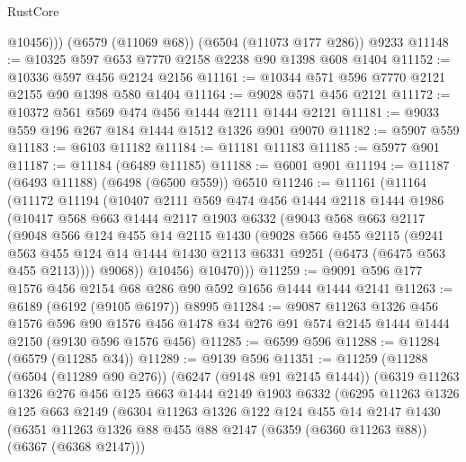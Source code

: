 \begin{lexlean}{RustCore}
\begin{coremodule}
          @10456)))
    (@6579 (@11069 @68))
    (@6504 (@11073 @177 @286))
    @9233
@11148 := @10325 @597 @653 @7770 @2158 @2238 @90 @1398 @608 @1404
@11152 := @10336 @597 @456 @2124 @2156
@11161 := @10344 @571 @596 @7770 @2121 @2155 @90 @1398 @580 @1404
@11164 := @9028 @571 @456 @2121
@11172 := @10372 @561 @569 @474 @456 @1444 @2111 @1444 @2121
@11181 := @9033 @559 @196 @267 @184 @1444 @1512 @1326 @901 @9070
@11182 := @5907 @559
@11183 := @6103 @11182
@11184 := @11181 @11183
@11185 := @5977 @901
@11187 := @11184 (@6489 @11185)
@11188 := @6001 @901
@11194 := @11187 (@6493 @11188) (@6498 (@6500 @559)) @6510
@11246 := @11161
    (@11164
      (@11172
        @11194
        (@10407
          @2111
          @569
          @474
          @456
          @1444
          @2118
          @1444
          @1986
          (@10417
            @568
            @663
            @1444
            @2117
            @1903
            @6332
            (@9043
              @568
              @663
              @2117
              (@9048
                @566
                @124
                @455
                @14
                @2115
                @1430
                (@9028
                  @566
                  @455
                  @2115
                  (@9241
                    @563
                    @455
                    @124
                    @14
                    @1444
                    @1430
                    @2113
                    @6331
                    @9251
                    (@6473 (@6475 @563 @455 @2113))))
                @9068))
            @10456)
          @10470)))
@11259 := @9091 @596 @177 @1576 @456 @2154 @68 @286 @90 @592 @1656 @1444 @1444 @2141
@11263 := @6189 (@6192 (@9105 @6197)) @8995
@11284 := @9087
    @11263
    @1326
    @456
    @1576
    @596
    @90
    @1576
    @456
    @1478
    @34
    @276
    @91
    @574
    @2145
    @1444
    @1444
    @2150
    (@9130 @596 @1576 @456)
@11285 := @6599 @596
@11288 := @11284 (@6579 (@11285 @34))
@11289 := @9139 @596
@11351 := @11259
    (@11288
      (@6504 (@11289 @90 @276))
      (@6247 (@9148 @91 @2145 @1444))
      (@6319
        @11263
        @1326
        @276
        @456
        @125
        @663
        @1444
        @2149
        @1903
        @6332
        (@6295
          @11263
          @1326
          @125
          @663
          @2149
          (@6304
            @11263
            @1326
            @122
            @124
            @455
            @14
            @2147
            @1430
            (@6351 @11263 @1326 @88 @455 @88 @2147 (@6359 (@6360 @11263 @88)) (@6367 (@6368 @2147)))

\end{coremodule}
\end{lexlean}
